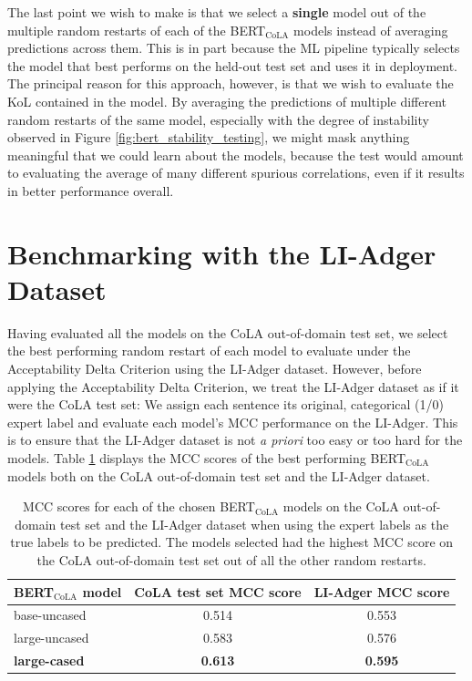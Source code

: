 The last point we wish to make is that we select a \textbf{single} model out of the multiple random restarts of each of the BERT$_\mathrm{CoLA}$ models instead of averaging predictions across them.  This is in part because the ML pipeline typically selects the model that best performs on the held-out test set and uses it in deployment.  The principal reason for this approach, however, is that we wish to evaluate the KoL contained in the model.  By averaging the predictions of multiple different random restarts of the same model, especially with the degree of instability observed in Figure \ref{fig:bert_stability_testing}, we might mask anything meaningful that we could learn about the models, because the test would amount to evaluating the average of many different spurious correlations, even if it results in better performance overall.


\section{Benchmarking with the LI-Adger Dataset}
\label{section:2.4}

Having evaluated all the models on the CoLA out-of-domain test set, we select the best performing random restart of each model to evaluate under the Acceptability Delta Criterion using the LI-Adger dataset.  However, before applying the Acceptability Delta Criterion, we treat the LI-Adger dataset as if it were the CoLA test set: We assign each sentence its original, categorical (1/0) expert label and evaluate each model's MCC performance on the LI-Adger.  This is to ensure that the LI-Adger dataset is not \textit{a priori} too easy or too hard for the models. Table \ref{tab:table_7} displays the MCC scores of the best performing BERT$_\mathrm{CoLA}$ models both on the CoLA out-of-domain test set and the LI-Adger dataset.

\begin{table}[h]
    \centering
    \begin{tabular}{@{}lcc@{}}
    \toprule
    \textbf{BERT$_\mathrm{CoLA}$ model} & \textbf{CoLA test set MCC score} & \textbf{LI-Adger MCC score}  \\
    \midrule
    base-uncased & 0.514 & 0.553 \\
    large-uncased & 0.583 & 0.576 \\
    \textbf{large-cased} & \textbf{0.613} & \textbf{0.595} \\
    \bottomrule
    \end{tabular}
    \caption[MCC scores on the CoLA test set and LI-Adger dataset]{MCC scores for each of the chosen BERT$_\mathrm{CoLA}$ models on the CoLA out-of-domain test set and the LI-Adger dataset when using the expert labels as the true labels to be predicted.  The models selected had the highest MCC score on the CoLA out-of-domain test set out of all the other random restarts.}
    \label{tab:table_7}
\end{table}

